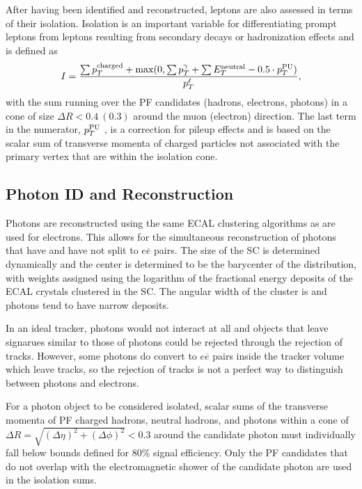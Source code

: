 After having been identified and reconstructed, 
 leptons are also assessed in terms of their
 isolation.
Isolation is an important variable for 
 differentiating prompt leptons from 
 leptons resulting from secondary decays or
 hadronization effects and is defined as
\begin{equation}
\label{eq:iso}
I =\frac{ \sum p_T^{\mathrm{charged}}+{\mathrm{max}}(0,\sum p_T^{\gamma}+\sum E_T^{\mathrm{neutral}}-0.5\cdot p_T^{\mathrm{PU}})}{p_T^\ell},
\end{equation}
 with the sum running over the PF candidates (hadrons, electrons, photons)
 in a cone of size $\Delta R < 0.4~(0.3)$ around the muon (electron) direction.
The last term in the numerator, $p_T^{\mathrm{PU}}$ ,
 is a correction for pileup effects
 and is based on the scalar sum of transverse momenta of charged particles
 not associated with the primary vertex that are within the isolation cone.

\subsection{Photon ID and Reconstruction}

 Photons are reconstructed using the same ECAL
  clustering algorithms as are used for electrons.
 This allows for
  the simultaneous reconstruction of
  photons that have and have not split to $e\overline{e}$
  pairs.
 The size of the SC is determined dynamically
  and the center is determined to be the barycenter
  of the distribution, with weights assigned
  using the logarithm of the fractional energy deposits
  of the ECAL crystals clustered in the SC.
 The angular width of the cluster is \sieie 
  and photons tend to have narrow deposits.

 In an ideal tracker, photons would not interact 
  at all and objects that leave signarues
  similar to those of photons could be rejected
  through the rejection of tracks.
 However, some photons do convert to $e\overline{e}$
  pairs inside the tracker volume which leave tracks,
  so the rejection of tracks is not a perfect way 
  to distinguish between photons and electrons.

 For a photon object to be considered isolated,
  scalar sums of the transverse momenta of PF charged hadrons, neutral
  hadrons, and photons within a cone of $\Delta R = \sqrt{(\Delta
   \eta)^2 + (\Delta \phi)^2} < 0.3$ around the candidate photon must
  individually fall below bounds defined for 80\% signal
  efficiency.
 Only the PF candidates that do not overlap with the
  electromagnetic shower of the candidate photon are used in the
  isolation sums.

